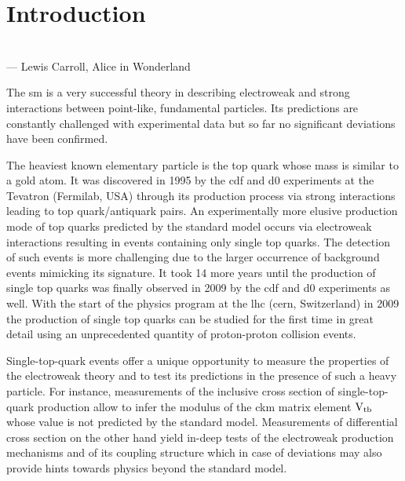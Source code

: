 \chapter*{Introduction}


\hspace{0.14\textwidth}\parbox[t][][t]{0.83\textwidth}{
\small{}\\\mbox{}\hfill --- Lewis Carroll, Alice in Wonderland\\[0.6\baselineskip]
}

The \acrlong{sm} is a very successful theory in describing electroweak and strong interactions between point-like, fundamental particles. Its predictions are constantly challenged with experimental data but so far no significant deviations have been confirmed. 

The heaviest known elementary particle is the top quark whose mass is similar to a gold atom. It was discovered in 1995 by the \gls{cdf} and \gls{d0} experiments at the Tevatron (Fermilab, USA) through its production process via strong interactions leading to top quark/antiquark pairs. An experimentally more elusive production mode of top quarks predicted by the standard model occurs via electroweak interactions resulting in events containing only single top quarks. The detection of such events is more challenging due to the larger occurrence of background events mimicking its signature. It took 14 more years until the production of single top quarks was finally observed in 2009 by the \gls{cdf} and \gls{d0} experiments as well. With the start of the physics program at the \gls{lhc} (\gls{cern}, Switzerland) in 2009 the production of single top quarks can be studied for the first time in great detail using an unprecedented quantity of proton-proton collision events.

Single-top-quark events offer a unique opportunity to measure the properties of the electroweak theory and to test its predictions in the presence of such a heavy particle. For instance, measurements of the inclusive cross section of single-top-quark production allow to infer the modulus of the \gls{ckm} matrix element ${\textrm{V}_\textrm{tb}}$ whose value is not predicted by the standard model. Measurements of differential cross section on the other hand yield in-deep tests of the electroweak production mechanisms and of its coupling structure which in case of deviations may also provide hints towards physics beyond the standard model.

